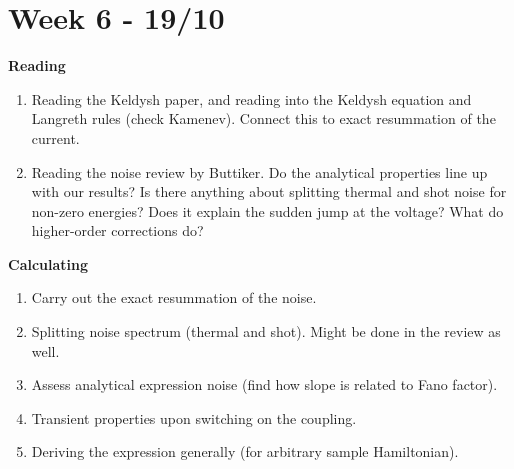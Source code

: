 \section{Week 6 - 19/10}
\begin{tcolorbox}[title = Roadmap, colback = red!7!white, colbacktitle = red!95!black]
    \textbf{Reading}
    \begin{enumerate}
        \itemsep0em
        \item Reading the Keldysh paper, and reading into the Keldysh equation and Langreth rules (check Kamenev). Connect this to exact resummation of the current.
        \item Reading the noise review by Buttiker. Do the analytical properties line up with our results? Is there anything about splitting thermal and shot noise for non-zero energies? Does it explain the sudden jump at the voltage? What do higher-order corrections do?
    \end{enumerate}
    \textbf{Calculating}
    \begin{enumerate}
        \itemsep0em
        \item Carry out the exact resummation of the noise.
        \item Splitting noise spectrum (thermal and shot). Might be done in the review as well.
        \item Assess analytical expression noise (find how slope is related to Fano factor).
        \item Transient properties upon switching on the coupling.
        \item Deriving the expression generally (for arbitrary sample Hamiltonian).
    \end{enumerate}
\end{tcolorbox}


